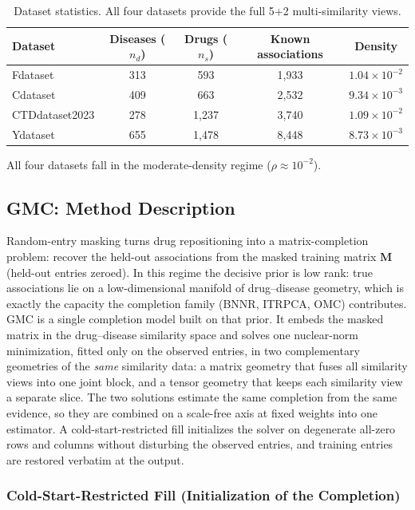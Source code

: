 \documentclass[webpdf,modern,large]{oup-authoring-template}
\begin{document}
\begin{table}[tb]
\centering
\caption{Dataset statistics. All four datasets provide the full 5+2 multi-similarity views.}
\label{tab:datasets}
\begin{tabular}{lcccc}
\toprule
Dataset & Diseases ($n_d$) & Drugs ($n_s$) & Known associations & Density \\
\midrule
Fdataset & 313 & 593 & 1,933 & $1.04 \times 10^{-2}$ \\
Cdataset & 409 & 663 & 2,532 & $9.34 \times 10^{-3}$ \\
CTDdataset2023 & 278 & 1,237 & 3,740 & $1.09 \times 10^{-2}$ \\
Ydataset & 655 & 1,478 & 8,448 & $8.73 \times 10^{-3}$ \\
\bottomrule
\end{tabular}
\end{table}

All four datasets fall in the moderate-density regime ($\rho \approx 10^{-2}$).

\subsection{GMC: Method Description}
\label{sec:method}

Random-entry masking turns drug repositioning into a matrix-completion problem: recover the held-out associations from the masked training matrix $\mathbf{M}$ (held-out entries zeroed). In this regime the decisive prior is low rank: true associations lie on a low-dimensional manifold of drug--disease geometry, which is exactly the capacity the completion family (BNNR, ITRPCA, OMC) contributes. GMC is a single completion model built on that prior. It embeds the masked matrix in the drug--disease similarity space and solves one nuclear-norm minimization, fitted only on the observed entries, in two complementary geometries of the \emph{same} similarity data: a matrix geometry that fuses all similarity views into one joint block, and a tensor geometry that keeps each similarity view a separate slice. The two solutions estimate the same completion from the same evidence, so they are combined on a scale-free axis at fixed weights into one estimator. A cold-start-restricted fill initializes the solver on degenerate all-zero rows and columns without disturbing the observed entries, and training entries are restored verbatim at the output.

\subsubsection{Cold-Start-Restricted Fill (Initialization of the Completion)}
\end{document}
